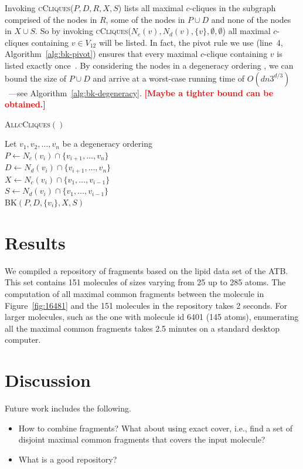 \documentclass[11pt]{article}
\newcommand{\todo}[1]{\xspace{\bfseries\sffamily\textcolor{red}{[#1]}}\xspace}
\begin{document}
Invoking \textsc{cCliques}($P, D, R, X, S$) lists all maximal $c$-cliques in the
subgraph comprised of the nodes in $R$, some of the nodes in $P \cup D$
and none of the nodes in $X \cup S$. So by invoking \textsc{cCliques}($N_c(v),
N_d(v), \{ v \}, \emptyset, \emptyset$) all maximal $c$-cliques containing $v
\in V_{12}$ will be listed. In fact, the pivot rule we use (line~4,
Algorithm~\ref{alg:bk-pivot}) ensures that every maximal $c$-clique containing
$v$ is listed exactly once~\cite{Tomita:2006kb}. By considering the nodes in a
degeneracy ordering \cite{Eppstein:2010uq}, we can bound the size of $P \cup D$
and arrive at a worst-case running time of
$O(dn3^{d/3})$~\cite{Eppstein:2010uq}---see Algorithm~\ref{alg:bk-degeneracy}.
\todo{Maybe a tighter bound can be obtained.}

\begin{algorithm2e}
  \caption{\textsc{AllcCliques}$()$}
  \label{alg:bk-degeneracy}
  Let $v_1, v_2, \ldots, v_n$ be a degeneracy ordering\\
  {
    $P \leftarrow N_c(v_i) \cap \{v_{i+1}, \ldots, v_n\}$\\
    $D \leftarrow N_d(v_i) \cap \{v_{i+1}, \ldots, v_n\}$\\
    $X \leftarrow N_c(v_i) \cap \{v_1, \ldots, v_{i-1}\}$\\
    $S \leftarrow N_d(v_i) \cap \{v_1, \ldots, v_{i-1}\}$\\
    \textsc{BK}$(P, D, \{v_i\}, X, S)$
  }
\end{algorithm2e}

\section{Results}

We compiled a repository of fragments based on the lipid data set of the ATB. 
This set contains 151 molecules of sizes varying from 25 up to 285 atoms. 
The computation of all maximal common fragments between the molecule in 
Figure~\ref{fig:16481} and the 151 molecules in the repository takes 2 seconds. 
For larger molecules, such as the one with molecule id 6401 (145 atoms), 
enumerating all the maximal common fragments takes 2.5 minutes on a standard
desktop computer.

\section{Discussion}

Future work includes the following.
\begin{itemize}
  \item How to combine fragments? What about using exact cover, i.e., find a set
    of disjoint maximal common fragments that covers the input molecule?
  \item What is a good repository?
\end{itemize}



\end{document}
